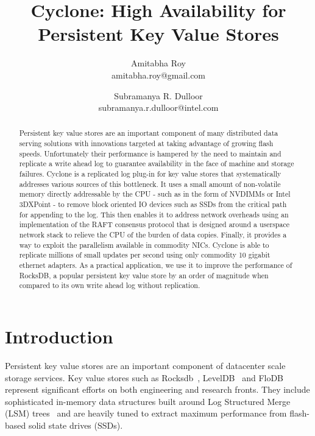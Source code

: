 \documentclass[letterpaper,twocolumn,10pt]{article}
\begin{document}
\title{Cyclone: High Availability for Persistent Key Value Stores}

\author{{\rm Amitabha Roy} \\ amitabha.roy@gmail.com
	     \and {\rm Subramanya R. Dulloor} \\ subramanya.r.dulloor@intel.com}

\date{}
\maketitle


\begin{abstract}
\vspace{0.05in}
Persistent key value stores are an important component of many
distributed data serving solutions with innovations targeted at taking
advantage of growing flash speeds. Unfortunately their performance is
hampered by the need to maintain and replicate a write ahead log to
guarantee availability in the face of machine and storage
failures. Cyclone is a replicated log plug-in for key value stores
that systematically addresses various sources of this bottleneck. It
uses a small amount of non-volatile memory directly addressable by the
CPU - such as in the form of NVDIMMs or Intel 3DXPoint - to remove
block oriented IO devices such as SSDs from the critical path for
appending to the log. This then enables it to address network
overheads using an implementation of the RAFT consensus protocol that
is designed around a userspace network stack to relieve the CPU of the
burden of data copies.  Finally, it provides a way to exploit the
parallelism available in commodity NICs.  Cyclone is able to replicate
millions of small updates per second using only commodity 10 gigabit
ethernet adapters. As a practical application, we use it to improve
the performance of RocksDB, a popular persistent key value store by an
order of magnitude when compared to its own write ahead log without
replication.
\end{abstract}

\section{Introduction}
Persistent key value stores are an important component of datacenter
scale storage services. Key value stores such as
Rocksdb~\cite{rocksdb}, LevelDB~\cite{leveldb} and FloDB~\cite{flodb}
represent significant efforts on both engineering and research
fronts. They include sophisticated in-memory data structures built
around Log Structured Merge (LSM) trees~\cite{lsmtree} and are heavily
tuned to extract maximum performance from flash-based solid state
drives (SSDs).
\end{document}

